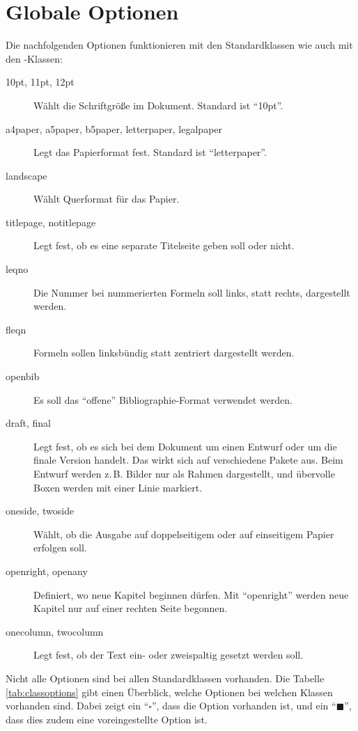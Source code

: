 \section{Globale Optionen}
\label{sec:globaleoptionen}

Die nachfolgenden Optionen funktionieren mit den Standardklassen wie auch mit den \KOMAScript-Klassen:

\begin{description}
	\item[10pt, 11pt, 12pt] Wählt die Schriftgröße im Dokument. Standard ist \enquote{10pt}.
	\item[a4paper, a5paper, b5paper, letterpaper, legalpaper]
		Legt das Papier\-format fest. Standard ist \enquote{letterpaper}.
	\item[landscape] Wählt Querformat für das Papier.
	\item[titlepage, notitlepage] Legt fest, ob es eine separate Titelseite
		geben soll oder nicht.
	\item[leqno] Die Nummer bei nummerierten Formeln soll links, statt rechts,
		dargestellt werden.
	\item[fleqn] Formeln sollen linksbündig statt zentriert dargestellt werden.
	\item[openbib] Es soll das \enquote{offene} Bibliographie-Format verwendet werden.
	\item[draft, final] Legt fest, ob es sich bei dem Dokument um einen Entwurf
	  oder um die finale Version handelt. Das wirkt sich auf verschiedene Pakete
	  aus. Beim Entwurf werden z.\,B. Bilder nur als Rahmen dargestellt, und
	  übervolle Boxen werden mit einer Linie markiert.
	\item[oneside, twoside] Wählt, ob die Ausgabe auf doppelseitigem oder auf 
	  einseitigem Papier erfolgen soll.
	\item[openright, openany] Definiert, wo neue Kapitel beginnen dürfen. Mit
		\enquote{openright} werden neue Kapitel nur auf einer rechten Seite begonnen.
	\item[onecolumn, twocolumn] Legt fest, ob der Text ein- oder zweispaltig
		gesetzt werden soll.
\end{description}

Nicht alle Optionen sind bei allen Standardklassen vorhanden. Die Tabelle \ref{tab:classoptions} gibt einen Überblick, welche Optionen bei welchen Klassen vorhanden sind. Dabei zeigt ein \enquote{$\square$}, dass die Option vorhanden ist, und ein \enquote{$\blacksquare$}, dass dies zudem eine voreingestellte Option ist.

